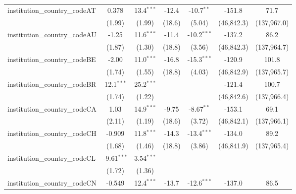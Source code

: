 \begin{tabular}{lcccccc}
   institution\_country\_codeAT          & 0.378         & 13.4$^{***}$  & -12.4         & -10.7$^{**}$  & -151.8       & 71.7\\   
                                         & (1.99)        & (1.99)        & (18.6)        & (5.04)        & (46,842.3)   & (137,967.0)\\   
   institution\_country\_codeAU          & -1.25         & 11.6$^{***}$  & -11.4         & -10.2$^{***}$ & -137.2       & 86.2\\   
                                         & (1.87)        & (1.30)        & (18.8)        & (3.56)        & (46,842.3)   & (137,964.7)\\   
   institution\_country\_codeBE          & -2.00         & 11.0$^{***}$  & -16.8         & -15.3$^{***}$ & -120.9       & 101.8\\   
                                         & (1.74)        & (1.55)        & (18.8)        & (4.03)        & (46,842.9)   & (137,965.7)\\   
   institution\_country\_codeBR          & 12.1$^{***}$  & 25.2$^{***}$  &               &               & -121.4       & 100.7\\   
                                         & (1.74)        & (1.22)        &               &               & (46,842.6)   & (137,966.4)\\   
   institution\_country\_codeCA          & 1.03          & 14.9$^{***}$  & -9.75         & -8.67$^{**}$  & -153.1       & 69.1\\   
                                         & (2.11)        & (1.19)        & (18.6)        & (3.72)        & (46,842.1)   & (137,966.1)\\   
   institution\_country\_codeCH          & -0.909        & 11.8$^{***}$  & -14.3         & -13.4$^{***}$ & -134.0       & 89.2\\   
                                         & (1.68)        & (1.46)        & (18.8)        & (3.86)        & (46,841.9)   & (137,965.4)\\   
   institution\_country\_codeCL          & -9.61$^{***}$ & 3.54$^{***}$  &               &               &              &   \\   
                                         & (1.72)        & (1.36)        &               &               &              &   \\   
   institution\_country\_codeCN          & -0.549        & 12.4$^{***}$  & -13.7         & -12.6$^{***}$ & -137.0       & 86.5\\   

\end{tabular}
